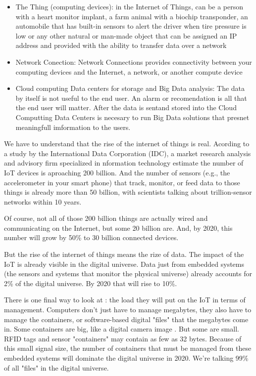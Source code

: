 \begin{itemize}
\item The Thing (computing devices):  in the Internet 
of Things, can be a person with a heart monitor implant, a farm animal with a 
biochip transponder, an automobile that has built-in sensors to alert the driver 
when tire pressure is low or any other natural or man-made object that can be 
assigned an IP address and provided with the ability to transfer data over a 
network
\item Network Conection: Network Connections provides connectivity between your 
computing devices  and the Internet, a network, or another compute device 

\item Cloud computing Data centers for storage and Big Data analysis: The data 
by itself is not useful to the end user. An alarm or recomendation is all that 
the end user will matter. After the data is sentand stored into the Cloud 
Computting Data Centers is necesary to run Big Data solutions that presnet 
meaningfull imformation to the users.
\end{itemize}

We have to understand that the rise of the internet of things is real. Acording 
to a study by the International Data Corporation (IDC), a market research 
analysis and advisory firm specialized in nformation technology estimate the 
number of IoT devices is aproaching  200 billion. And the number of sensors 
(e.g., the accelerometer in your smart phone) that track, monitor, or feed data 
to those things is already more than 50 billion, with scientists talking about 
trillion-sensor networks within 10 years.

Of course, not all of those 200 billion things are actually wired and 
communicating on the Internet, but some 20 billion are. And, by 2020, this 
number will grow by 50\% to 30 billion connected devices.

But the rise of the internet of things means the rize of data. The impact of the 
IoT is already visible in the digital universe. Data just from embedded systems 
(the sensors and systems that monitor the physical universe) already accounts 
for 2\% of the digital universe. By 2020 that will rise to 10\%.

There is one final way to look at : the load they will put on the IoT in terms 
of management. Computers don't just have to manage megabytes, they also have 
to manage the containers, or software-based digital "files" that the megabytes 
come in. Some containers are big, like a digital camera image . But some are 
small. RFID tags and sensor "containers" may contain as few as 32 bytes. Because 
of this small signal size, the number of containers that must be managed from 
these embedded systems will dominate the digital universe in 2020. We’re 
talking 99\% of all "files" in the digital universe.

